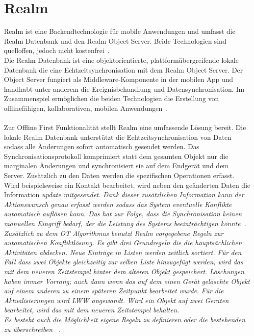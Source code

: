 \section{\label{sub:realm}Realm}
Realm ist eine Backendtechnologie für mobile Anwendungen und umfasst die Realm Datenbank und den Realm Object Server. Beide Technologien sind quelloffen, jedoch nicht kostenfrei~\cite{realm}.\\
Die Realm Datenbank ist eine objektorientierte, plattformübergreifende lokale Datenbank die eine Echtzeitsynchronisation mit dem Realm Object Server.
Der Object Server fungiert als \gls{Middleware}-Komponente in der mobilen \gls{App} und handhabt unter anderem die Ereignisbehandlung und Datensynchronisation. Im Zusammenspiel ermöglichen die beiden Technologien die Erstellung von offlinefähigen, kollaborativen, mobilen Anwendungen~\cite{realm_whitepaper}.\\\\
Zur Offline First Funktionalität stellt Realm eine umfassende Lösung bereit.
Die lokale Realm Datenbank unterstützt die Echtzeitsynchronisation von Daten sodass alle Änderungen sofort automatisch gesendet werden. Das Synchronisationsprotokoll komprimiert statt dem gesamten Objekt nur die marginalen Änderungen und synchronisiert sie auf dem Endgerät und dem Server. Zusätzlich zu den Daten werden die spezifischen Operationen erfasst. 
Wird beispielsweise ein Kontakt bearbeitet, wird neben den geänderten Daten die Information \it{update} mitgesendet.
Dank dieser zusätzlichen Information kann der Aktionswunsch genau erfasst werden sodass das System eventuelle Konflikte automatisch auflösen kann. Das hat zur Folge, dass die Synchronisation keinen manuellen Eingriff bedarf, der die Leistung des Systems beeinträchtigen könnte~\cite{realm_offline_whitepaper}.\\
Zusätzlich zu dem \gls{OT} Algorithmus benutzt Realm vorgegebene Regeln zur automatischen Konfliktlösung. Es gibt drei Grundregeln die die hauptsächlichen Aktivitäten abdecken. Neue Einträge in Listen werden zeitlich sortiert. Für den Fall dass zwei Objekte gleichzeitig zur selben Liste hinzugefügt werden, wird das mit dem neueren Zeitstempel hinter dem älteren Objekt gespeichert.
Löschungen haben immer Vorrang; auch dann wenn das auf dem einen Gerät gelöschte Objekt auf einem anderen zu einem späteren Zeitpunkt bearbeitet wurde. Für die Aktualisierungen wird \gls{LWW} angewandt. Wird ein Objekt auf zwei Geräten bearbeitet, wird das mit dem neueren Zeitstempel behalten.\\ 
Es besteht auch die Möglichkeit eigene Regeln zu definieren oder die bestehenden zu überschreiben ~\cite{realm_conflict}.
